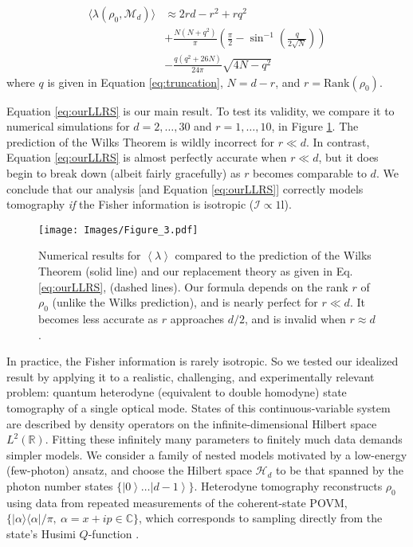 \documentclass[aps,pra, twocolumn]{revtex4}
\newcommand{\M}{\mathcal{M}}
\newcommand{\reals}{\mathbb{R}}
\newcommand{\ket}[1]{\ensuremath{\left|#1\right\rangle}}
\newcommand{\expect}[1]{\ensuremath{\left\langle#1\right\rangle}}
\def\Id{1\!\mathrm{l}}
\newcommand{\Fi}{\mathcal{I}}
\begin{document}
\begin{align}
\label{eq:ourLLRS}
\nonumber \langle \lambda(\rho_{0}, \M_{d}) \rangle &\approx 2rd - r^{2}+rq^{2}\\
\nonumber &+  \frac{N(N+q^2)}{\pi} \left( \frac{\pi}{2} - \sin^{-1}\left(\frac{q}{{2\sqrt{N}}}\right)\right)\\
& - \frac{q(q^2+26N)}{24\pi} \sqrt{4N-q^2}
\end{align}
where $q$ is given in Equation \eqref{eq:truncation}, $N=d-r$, and $r = \mathrm{Rank}(\rho_{0})$.

Equation \eqref{eq:ourLLRS} is our main result.  To test its validity, we compare it to numerical simulations for $d=2,\ldots,30$ and $r=1,\ldots,10$, in Figure \ref{fig:modelcomp-iso}.  The prediction of the Wilks Theorem is wildly incorrect for $r\ll d$. In contrast, Equation \ref{eq:ourLLRS} is almost perfectly accurate when $r \ll d$, but it does begin to break down (albeit fairly gracefully) as $r$ becomes comparable to $d$.  We conclude that our analysis [and Equation \eqref{eq:ourLLRS}] correctly models tomography \emph{if} the Fisher information is isotropic ($\Fi \propto \Id$).

\begin{figure}[h]
 \texttt{[image: Images/Figure\_3.pdf]}
 \caption{Numerical results for $\expect{\lambda}$ compared to the prediction of the Wilks Theorem (solid line) and our replacement theory as given in Eq. \ref{eq:ourLLRS}, (dashed lines).  Our formula depends on the rank $r$ of $\rho_0$ (unlike the Wilks prediction), and is nearly perfect for $r\ll d$.  It becomes less accurate as $r$ approaches $d/2$, and is invalid when $r\approx d$.}
 \label{fig:modelcomp-iso}
\end{figure}

In practice, the Fisher information is rarely isotropic.  So we tested our idealized result by applying it to a realistic, challenging, and experimentally relevant problem: quantum heterodyne (equivalent to double homodyne) state tomography \cite{Lvovsky2001a, Bertrand1987, Leonhardt1995, Lvovsky2009} of a single optical mode.  States of this continuous-variable system are described by density operators on the infinite-dimensional Hilbert space $L^2(\reals)$.  Fitting these infinitely many parameters to finitely much data demands simpler models.
We consider a family of nested models motivated by a low-energy (few-photon) ansatz, and choose   
the Hilbert space $\mathcal{H}_d$ to be that spanned by the photon number states $\{\ket{0}\ldots\ket{d-1}\}$.
Heterodyne tomography reconstructs $\rho_{0}$ using data from repeated measurements of the 
coherent-state POVM, $\{|\alpha\rangle\langle \alpha| /\pi, ~\alpha=x+ip\in \mathbb{C}\}$, which corresponds to sampling directly from the 
state's Husimi $Q$-function \cite{Husimi1940}.
\end{document}
